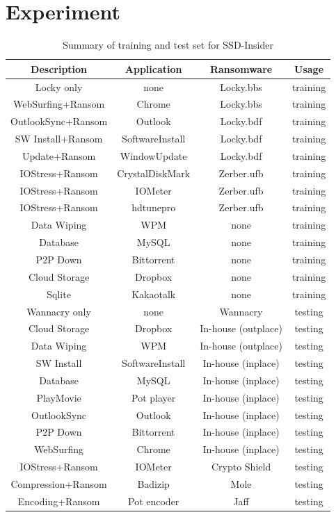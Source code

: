 \documentclass[conference]{IEEEtran}
\newcommand{\ours}{SSD-Insider}
\begin{document}

\section{Experiment}

\begin{table}[t]
	\centering
	\caption{Summary of training and test set for \ours{}}
	\begin{tabular}{c|c|c|c}
		\hline
		Description & Application & Ransomware & Usage \\
		\hline
		\hline
		Locky only & none & Locky.bbs & training  \\
		WebSurfing+Ransom & Chrome & Locky.bbs & training \\
		OutlookSync+Ransom & Outlook & Locky.bdf & training \\
		SW Install+Ransom & SoftwareInstall & Locky.bdf & training \\
		Update+Ransom & WindowUpdate & Locky.bdf & training \\
		IOStress+Ransom & CrystalDiskMark & Zerber.ufb & training \\
		IOStress+Ransom & IOMeter & Zerber.ufb & training \\
		IOStress+Ransom & hdtunepro & Zerber.ufb & training \\
		Data Wiping & WPM & none & training \\
		Database & MySQL & none & training \\
		P2P Down & Bittorrent & none & training \\
		Cloud Storage & Dropbox & none & training \\
		Sqlite & Kakaotalk & none & training \\
		\hline
		Wannacry only & none & Wannacry & testing \\ 
		Cloud Storage & Dropbox & In-house (outplace) & testing \\
		Data Wiping & WPM & In-house (outplace) & testing \\
		SW Install & SoftwareInstall & In-house (inplace) & testing \\ 
		Database & MySQL & In-house (inplace) & testing \\ 
		PlayMovie & Pot player & In-house (inplace) & testing \\ 
		OutlookSync & Outlook & In-house (inplace) & testing \\ 
		P2P Down & Bittorrent & In-house (inplace) & testing \\ 
		WebSurfing & Chrome & In-house (inplace) & testing \\ 
		IOStress+Ransom & IOMeter & Crypto Shield & testing \\ 
		Compression+Ransom & Badizip & Mole & testing \\ 
		Encoding+Ransom & Pot encoder & Jaff & testing \\ 
		\hline
	\end{tabular}
	\label{tab:benchmarks}
\end{table}
\end{document}

